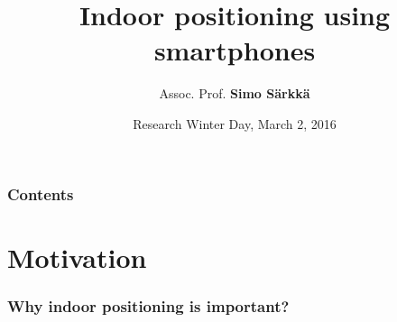 \documentclass[xcolor=svgnames,english,handout]{beamer}
\title{Indoor positioning using smartphones}
\author[Simo S\"arkk\"a]{Assoc. Prof. {\bf Simo S\"arkk\"a}}
\institute[EEA Departmen]{EEA Department @ELEC} %
\date[March 2, 2016]{Research Winter Day, March 2, 2016}
\begin{document}

\begin{frame}
  \titlepage
\end{frame}


\begin{frame}
  \frametitle{Contents}
  \tableofcontents[pausesections]
\end{frame}


\section{Motivation}

\begin{frame}
  \frametitle{Why indoor positioning is important?}



\end{frame}
\end{document}
